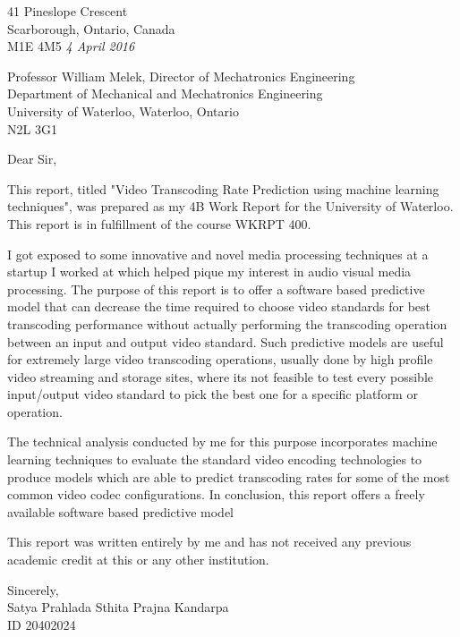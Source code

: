 \begin{flushleft}
    41 Pineslope Crescent\\
    Scarborough, Ontario, Canada\\
    M1E 4M5
    \textit{4 April 2016}
    
    Professor William Melek, Director of Mechatronics Engineering\\
    Department of Mechanical and Mechatronics Engineering\\
    University of Waterloo, Waterloo, Ontario\\
    N2L 3G1
    
    Dear Sir,

    This report, titled "Video Transcoding Rate Prediction using machine learning techniques", was prepared as my 4B Work Report for the University of Waterloo. This report is in fulfillment of the course WKRPT 400.

    I got exposed to some innovative and novel media processing techniques at a startup I worked at which helped pique my interest in audio visual media processing. The purpose of this report is to offer a software based predictive model that can decrease the time required to choose video standards for best transcoding performance without actually performing the transcoding operation between an input and output video standard. Such predictive models are useful for extremely large video transcoding operations, usually done by high profile video streaming and storage sites, where its not feasible to test every possible input/output video standard to pick the best one for a specific platform or operation.
    
    The technical analysis conducted by me for this purpose incorporates machine learning techniques to evaluate the standard video encoding technologies to produce models which are able to predict transcoding rates for some of the most common video codec configurations. In conclusion, this report offers a freely available software based predictive model
    
    This report was written entirely by me and has not received any previous academic credit at this or any other institution. 

    Sincerely,\\
    Satya Prahlada Sthita Prajna Kandarpa\\
    ID 20402024\\
\end{flushleft}
\cleardoublepage


